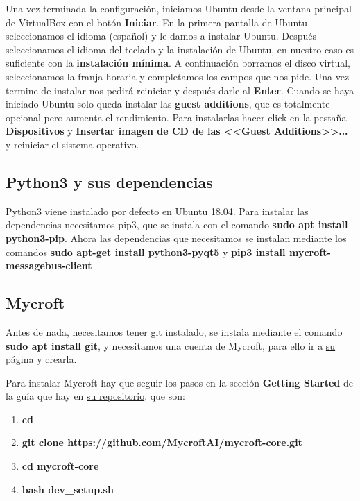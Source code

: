  

Una vez terminada la configuración, iniciamos Ubuntu desde la ventana principal de VirtualBox con el botón \textbf{Iniciar}. En la primera pantalla de Ubuntu seleccionamos el idioma (español) y le damos a instalar Ubuntu.
Después seleccionamos el idioma del teclado y la instalación de Ubuntu, en nuestro caso es suficiente con la \textbf{instalación mínima}. A continuación borramos el disco virtual, seleccionamos la franja horaria y completamos los campos que nos pide. Una vez termine de instalar nos pedirá reiniciar y después darle al \textbf{Enter}. Cuando se haya iniciado Ubuntu solo queda instalar las \textbf{guest additions}, que es totalmente opcional pero aumenta el rendimiento. Para instalarlas hacer click en la pestaña \textbf{Dispositivos} y \textbf{Insertar imagen de CD de las <<Guest Additions>>...} y reiniciar el sistema operativo.

 

\subsection{Python3 y sus dependencias}

Python3 viene instalado por defecto en Ubuntu 18.04. Para instalar las dependencias necesitamos pip3, que se instala con el comando \textbf{sudo apt install python3-pip}. Ahora las dependencias que necesitamos se instalan mediante los comandos \textbf{sudo apt-get install python3-pyqt5} y \textbf{pip3 install mycroft-messagebus-client}

\subsection{Mycroft}
Antes de nada, necesitamos tener git instalado, se instala mediante el comando \textbf{sudo apt install git}, y necesitamos una cuenta de Mycroft, para ello ir a \href{https://home.mycroft.ai/}{su página} y crearla.

Para instalar Mycroft hay que seguir los pasos en la sección \textbf{Getting Started} de la guía que hay en \href{https://github.com/MycroftAI/mycroft-core}{su repositorio}, que son:
\begin{enumerate}
	\item \textbf{cd \detokenize{~}}
	\item \textbf{git clone https://github.com/MycroftAI/mycroft-core.git}
	\item \textbf{cd mycroft-core}
	\item \textbf{bash dev\_setup.sh}
\end{enumerate}

